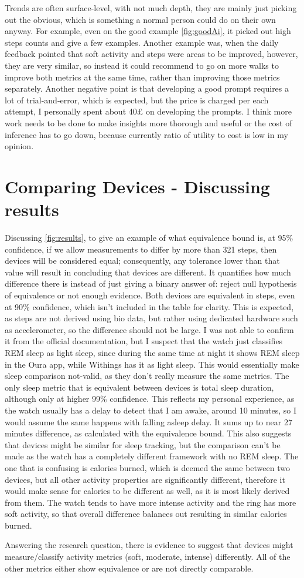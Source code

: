Trends are often surface-level, with not much depth, they are mainly just picking out the obvious, which is something a normal person could do on their own anyway. For example, even on the good example \ref{fig:goodAi}, it picked out high steps counts and give a few examples. Another example was, when the daily feedback pointed that soft activity and steps were areas to be improved, however, they are very similar, so instead it could recommend to go on more walks to improve both metrics at the same time, rather than improving those metrics separately. Another negative point is that developing a good prompt requires a lot of trial-and-error, which is expected, but the price is charged per each attempt, I personally spent about 40£ on developing the prompts.
I think more work needs to be done to make insights more thorough and useful or the cost of inference has to go down, because currently ratio of utility to cost is low in my opinion.
\section{Comparing Devices - Discussing results}
Discussing \ref{fig:results}, to give an example of what equivalence bound is, at 95\% confidence, if we allow measurements to differ by more than 321 steps, then devices will be considered equal; consequently, any tolerance lower than that value will result in concluding that devices are different. It quantifies how much difference there is instead of just giving a binary answer of: reject null hypothesis of equivalence or not enough evidence. Both devices are equivalent in steps, even at 90\% confidence, which isn't included in the table for clarity. This is expected, as steps are not derived using bio data, but rather using dedicated hardware such as accelerometer, so the difference should not be large. I was not able to confirm it from the official documentation, but I suspect that the watch just classifies REM sleep as light sleep, since during the same time at night it shows REM sleep in the Oura app, while Withings has it as light sleep. This would essentially make sleep comparison not-valid, as they don't really measure the same metrics. The only sleep metric that is equivalent between devices is total sleep duration, although only at higher 99\% confidence. This reflects my personal experience, as the watch usually has a delay to detect that I am awake, around 10 minutes, so I would assume the same happens with falling asleep delay. It sums up to near 27 minutes difference, as calculated with the equivalence bound. This also suggests that devices might be similar for sleep tracking, but the comparison can't be made as the watch has a completely different framework with no REM sleep.  The one that is confusing is calories burned, which is deemed the same between two devices, but all other activity properties are significantly different, therefore it would make sense for calories to be different as well, as it is most likely derived from them. The watch tends to have more intense activity and the ring has more soft activity, so that overall difference balances out resulting in similar calories burned.

Answering the research question, there is evidence to suggest that devices might measure/classify activity metrics (soft, moderate, intense) differently. All of the other metrics either show equivalence or are not directly comparable. 